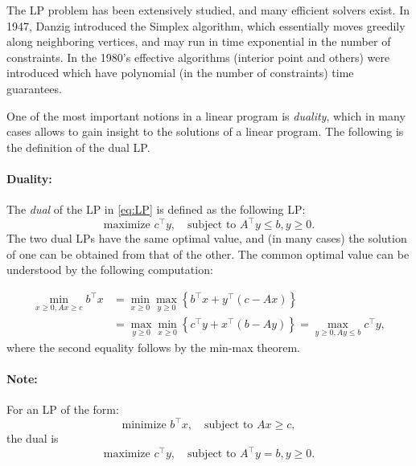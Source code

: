 The LP problem has been extensively studied, and many efficient solvers exist. In 1947, Danzig introduced the Simplex algorithm, which essentially moves greedily along neighboring vertices, and may run in time exponential in the number of constraints. In the 1980's effective algorithms (interior point and others) were introduced which have polynomial (in the number of
constraints) time guarantees.

One of the most important notions in a linear program is \textit{duality}, which in many cases allows to gain insight to the solutions of a linear program. The following is the definition of the dual LP.

\paragraph{Duality:} The \emph{dual} of the LP in \eqref{eq:LP} is defined as the following LP:
\begin{equation}\label{eq:LP_dual}
\textrm{maximize } {c^\top}y,   \quad \textrm{subject to } {A^\top}y
\le b,  y \ge 0.
\end{equation}
The two dual LPs have the same optimal value, and (in many cases)
the solution of one can be obtained from that of the other. The
common optimal value can be understood by the following computation:

\begin{align*}
\mathop {\min }\limits_{x \ge 0,Ax \ge c} {b^\top}x &= \mathop {\min }\limits_{x \ge 0} \mathop {\max }\limits_{y \ge 0} \left\{ {{b^\top}x + {y^\top}(c - Ax)} \right\}\\
 &= \mathop {\max }\limits_{y \ge 0} \mathop {\min }\limits_{x \ge 0} \left\{ {{c^\top}y + {x^\top}(b - Ay)} \right\} = \mathop {\max }\limits_{y \ge 0,Ay \le b} {c^\top}y,
\end{align*}
where the second equality follows by the min-max theorem.

\paragraph{Note:} For an LP of the form:
\begin{equation*}
 \textrm{minimize } {b^\top}x,   \quad \textrm{subject to } Ax \ge c,
\end{equation*}
the dual is
\begin{equation*}
\textrm{maximize } {c^\top}y,   \quad \textrm{subject to } {A^\top}y
= b,  y \ge 0.
\end{equation*}

